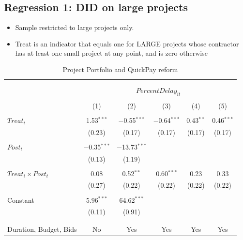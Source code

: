 \documentclass[
]{article}
\providecommand{\tightlist}{%
  \setlength{\itemsep}{0pt}\setlength{\parskip}{0pt}}
\begin{document}
\hypertarget{regression-1-did-on-large-projects}{%
\subsection{Regression 1: DID on large
projects}\label{regression-1-did-on-large-projects}}

\begin{itemize}
\tightlist
\item
  Sample restricted to large projects only.
\item
  Treat is an indicator that equals one for LARGE projects whose
  contractor has at least one small project at any point, and is zero
  otherwise
\end{itemize}

\begin{table}[H] \centering 
  \caption{Project Portfolio and QuickPay reform} 
  \label{} 
\small 
\begin{tabular}{@{\extracolsep{-10pt}}lccccc} 
\\[-1.8ex]\hline 
\hline \\[-1.8ex] 
\\[-1.8ex] & \multicolumn{5}{c}{$PercentDelay_{it}$} \\ 
\\[-1.8ex] & (1) & (2) & (3) & (4) & (5)\\ 
\hline \\[-1.8ex] 
 $Treat_i$ & 1.53$^{***}$ & $-$0.55$^{***}$ & $-$0.64$^{***}$ & 0.43$^{**}$ & 0.46$^{***}$ \\ 
  & (0.23) & (0.17) & (0.17) & (0.17) & (0.17) \\ 
  & & & & & \\ 
 $Post_t$ & $-$0.35$^{***}$ & $-$13.73$^{***}$ &  &  &  \\ 
  & (0.13) & (1.19) &  &  &  \\ 
  & & & & & \\ 
 $Treat_i \times Post_t$ & 0.08 & 0.52$^{**}$ & 0.60$^{***}$ & 0.23 & 0.33 \\ 
  & (0.27) & (0.22) & (0.22) & (0.22) & (0.22) \\ 
  & & & & & \\ 
 Constant & 5.96$^{***}$ & 64.62$^{***}$ &  &  &  \\ 
  & (0.11) & (0.91) &  &  &  \\ 
  & & & & & \\ 
\hline \\[-1.8ex] 
Duration, Budget, Bids & No & Yes & Yes & Yes & Yes \\ 

\end{tabular}
\end{table}
\end{document}
